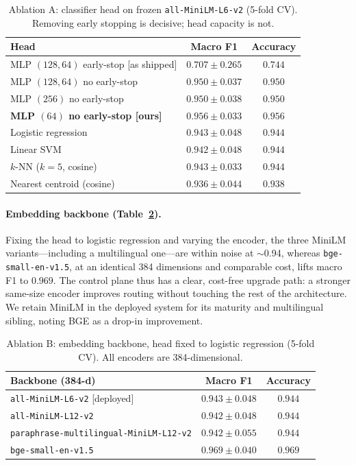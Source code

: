 \documentclass[runningheads]{llncs}
\begin{document}
\begin{table}[t]
\caption{Ablation A: classifier head on frozen \texttt{all-MiniLM-L6-v2} (5-fold CV). Removing early stopping is decisive; head capacity is not.}\label{tab:ablA}
\centering
\begin{tabular}{lcc}
\toprule
Head & Macro F1 & Accuracy \\
\midrule
MLP $(128,64)$ early-stop [as shipped] & $0.707\pm0.265$ & $0.744$ \\
MLP $(128,64)$ no early-stop           & $0.950\pm0.037$ & $0.950$ \\
MLP $(256)$ no early-stop              & $0.950\pm0.038$ & $0.950$ \\
\textbf{MLP $(64)$ no early-stop [ours]} & $\mathbf{0.956\pm0.033}$ & $\mathbf{0.956}$ \\
Logistic regression                    & $0.943\pm0.048$ & $0.944$ \\
Linear SVM                             & $0.942\pm0.048$ & $0.944$ \\
$k$-NN ($k{=}5$, cosine)               & $0.943\pm0.033$ & $0.944$ \\
Nearest centroid (cosine)              & $0.936\pm0.044$ & $0.938$ \\
\bottomrule
\end{tabular}
\end{table}

\paragraph{Embedding backbone (Table~\ref{tab:ablB}).}
Fixing the head to logistic regression and varying the encoder, the three MiniLM variants---including a multilingual one---are within noise at $\sim$0.94, whereas \texttt{bge-small-en-v1.5}, at an identical 384 dimensions and comparable cost, lifts macro F1 to $0.969$. The control plane thus has a clear, cost-free upgrade path: a stronger same-size encoder improves routing without touching the rest of the architecture. We retain MiniLM in the deployed system for its maturity and multilingual sibling, noting BGE as a drop-in improvement.

\begin{table}[t]
\caption{Ablation B: embedding backbone, head fixed to logistic regression (5-fold CV). All encoders are 384-dimensional.}\label{tab:ablB}
\centering
\begin{tabular}{lcc}
\toprule
Backbone (384-d) & Macro F1 & Accuracy \\
\midrule
\texttt{all-MiniLM-L6-v2} [deployed]              & $0.943\pm0.048$ & $0.944$ \\
\texttt{all-MiniLM-L12-v2}                        & $0.942\pm0.048$ & $0.944$ \\
\texttt{paraphrase-multilingual-MiniLM-L12-v2}    & $0.942\pm0.055$ & $0.944$ \\
\texttt{bge-small-en-v1.5}                        & $\mathbf{0.969\pm0.040}$ & $\mathbf{0.969}$ \\
\bottomrule
\end{tabular}
\end{table}
\end{document}
